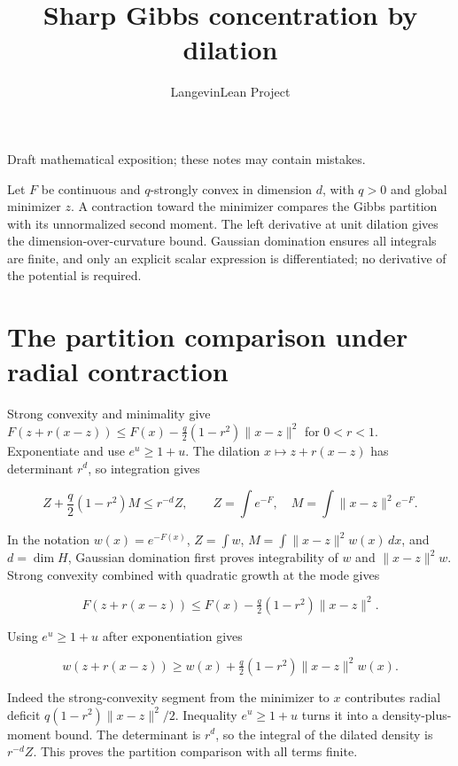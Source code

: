\documentclass[11pt,a4paper]{article}
\title{\texorpdfstring{Sharp Gibbs concentration by dilation}{Sharp Gibbs concentration by dilation}}
\author{LangevinLean Project}
\date{}
\begin{document}
\maketitle
Draft mathematical exposition; these notes may contain mistakes.


Let \(F\) be continuous and \(q\)-strongly convex in dimension \(d\), with \(q>0\) and global minimizer \(z\). A contraction toward the minimizer compares the Gibbs partition with its unnormalized second moment. The left derivative at unit dilation gives the dimension-over-curvature bound. Gaussian domination ensures all integrals are finite, and only an explicit scalar expression is differentiated; no derivative of the potential is required.


\section{\texorpdfstring{The partition comparison under radial contraction}{The partition comparison under radial contraction}}


Strong convexity and minimality give \(F(z+r(x-z))\le F(x)-\frac q2(1-r^2)\|x-z\|^2\) for \(0<r<1\). Exponentiate and use \(e^u\ge1+u\). The dilation \(x\mapsto z+r(x-z)\) has determinant \(r^d\), so integration gives

\[Z+\frac q2(1-r^2)M\le r^{-d}Z,\qquad Z=\int e^{-F},\quad M=\int\|x-z\|^2e^{-F}.\]

In the notation \(w(x)=e^{-F(x)}\), \(Z=\int w\), \(M=\int\|x-z\|^2w(x)\,dx\), and \(d=\dim H\), Gaussian domination first proves integrability of \(w\) and \(\|x-z\|^2w\). Strong convexity combined with quadratic growth at the mode gives

\[F(z+r(x-z))\le F(x)-\tfrac q2(1-r^2)\|x-z\|^2.\]

Using \(e^u\ge1+u\) after exponentiation gives

\[w(z+r(x-z))\ge w(x)+\tfrac q2(1-r^2)\|x-z\|^2w(x).\]

Indeed the strong-convexity segment from the minimizer to \(x\) contributes radial deficit \(q(1-r^2)\|x-z\|^2/2\). Inequality \(e^u\ge1+u\) turns it into a density-plus-moment bound. The determinant is \(r^d\), so the integral of the dilated density is \(r^{-d}Z\). This proves the partition comparison with all terms finite.
\end{document}
